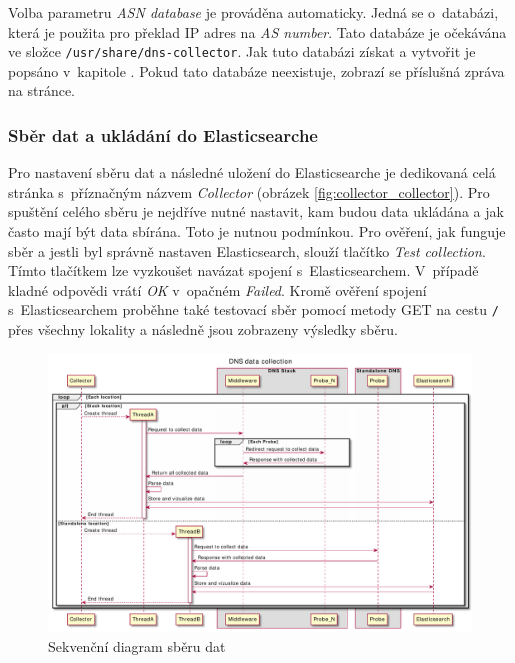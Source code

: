 \documentclass[thesis=M,czech]{src/FITthesis}[2019/12/23]
\begin{document}
Volba parametru \textit{ASN database} je prováděna automaticky. Jedná se o~databázi, která je použita pro překlad IP adres na \textit{AS number}. Tato databáze je očekávána ve složce \texttt{/usr/share/dns-collector}. Jak tuto databázi získat a vytvořit je popsáno v~kapitole \textit{}. Pokud tato databáze neexistuje, zobrazí se příslušná zpráva na stránce. 

\subsubsection{Sběr dat a ukládání do Elasticsearche}
Pro nastavení sběru dat a následné uložení do Elasticsearche je dedikovaná celá stránka s~příznačným názvem \textit{Collector} (obrázek \ref{fig:collector_collector}). Pro spuštění celého sběru je nejdříve nutné nastavit, kam budou data ukládána a jak často mají být data sbírána. Toto je nutnou podmínkou. Pro ověření, jak funguje sběr a jestli byl správně nastaven Elasticsearch, slouží tlačítko \textit{Test collection}. Tímto tlačítkem lze vyzkoušet navázat spojení s~Elasticsearchem. V~případě kladné odpovědi vrátí \textit{OK} v~opačném \textit{Failed}. Kromě ověření spojení s~Elasticsearchem proběhne také testovací sběr pomocí metody GET na cestu \texttt{/} přes všechny lokality a následně jsou zobrazeny výsledky sběru.

\begin{figure}[ht]
  \centering
   \includegraphics[width=1\textwidth]{images/dns-monitoring.pdf}
   \caption{Sekvenční diagram sběru dat}
     \label{fig:sequence-diagram}
\end{figure}
\end{document}
